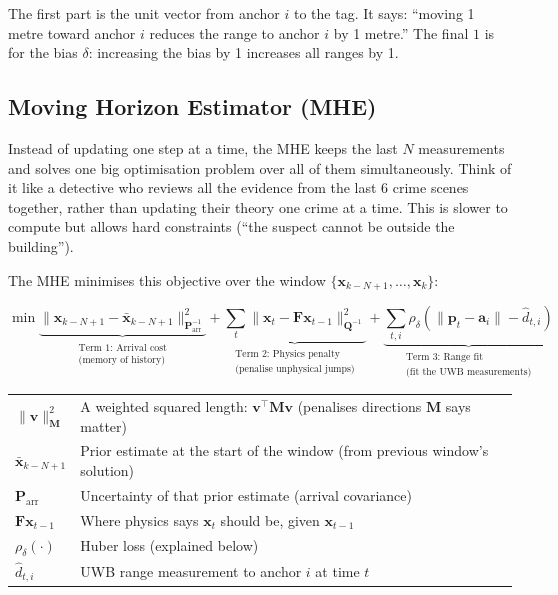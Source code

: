 \documentclass[11pt,a4paper]{article}
\newcommand{\vect}[1]{\bm{#1}}
\newcommand{\mat}[1]{\mathbf{#1}}
\begin{document}
The first part is the unit vector from anchor $i$ to the tag. It says: ``moving 1 metre toward anchor $i$ reduces the range to anchor $i$ by 1 metre.'' The final $1$ is for the bias $\delta$: increasing the bias by 1 increases all ranges by 1.

\subsection{Moving Horizon Estimator (MHE)}

\begin{plain}
Instead of updating one step at a time, the MHE keeps the last $N$ measurements and solves one big optimisation problem over all of them simultaneously. Think of it like a detective who reviews all the evidence from the last 6 crime scenes together, rather than updating their theory one crime at a time. This is slower to compute but allows hard constraints (``the suspect cannot be outside the building'').
\end{plain}

The MHE minimises this objective over the window $\{\vect{x}_{k-N+1}, \ldots, \vect{x}_k\}$:

\begin{equation}
\min \underbrace{\|\vect{x}_{k-N+1} - \bar{\vect{x}}_{k-N+1}\|^2_{\mat{P}_{\text{arr}}^{-1}}}_{\substack{\text{Term 1: Arrival cost} \\ \text{(memory of history)}}}
+ \underbrace{\sum_{t} \|\vect{x}_t - \mat{F}\vect{x}_{t-1}\|^2_{\mat{Q}^{-1}}}_{\substack{\text{Term 2: Physics penalty} \\ \text{(penalise unphysical jumps)}}}
+ \underbrace{\sum_{t,i} \rho_\delta\!\left(\|\vect{p}_t - \vect{a}_i\| - \hat{d}_{t,i}\right)}_{\substack{\text{Term 3: Range fit} \\ \text{(fit the UWB measurements)}}}
\label{eq:mhe}
\end{equation}

\begin{symbols}
\begin{tabular}{ll}
$\|\vect{v}\|^2_{\mat{M}}$ & A weighted squared length: $\vect{v}^\top\mat{M}\vect{v}$ (penalises directions $\mat{M}$ says matter) \\
$\bar{\vect{x}}_{k-N+1}$ & Prior estimate at the start of the window (from previous window's solution) \\
$\mat{P}_{\text{arr}}$ & Uncertainty of that prior estimate (arrival covariance) \\
$\mat{F}\vect{x}_{t-1}$ & Where physics says $\vect{x}_t$ should be, given $\vect{x}_{t-1}$ \\
$\rho_\delta(\cdot)$ & Huber loss (explained below) \\
$\hat{d}_{t,i}$ & UWB range measurement to anchor $i$ at time $t$ \\
\end{tabular}
\end{symbols}
\end{document}
